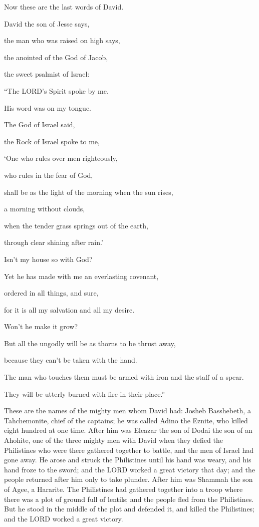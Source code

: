 \mychapter{} \myverse*{}Now these are the last words of David.

\quad\quad David the son of Jesse says,

the man who was raised on high says,

the anointed of the God of Jacob,

 the sweet psalmist of Israel:

\myverse{}“The LORD’s Spirit spoke by me.

His word was on my tongue.

\myverse{}The God of Israel said,

the Rock of Israel spoke to me,

‘One who rules over men righteously,

who rules in the fear of God,

\myverse{}shall be as the light of the morning when the sun rises,

a morning without clouds,

when the tender grass springs out of the earth,

through clear shining after rain.’


\vspace{\baselineskip} 
\myverse{}Isn’t my house so with God?

Yet he has made with me an everlasting covenant,

 ordered in all things, and sure,

for it is all my salvation and all my desire.

Won’t he make it grow?

\myverse{}But all the ungodly will be as thorns to be thrust away,

 because they can’t be taken with the hand.

\myverse{}The man who touches them must be armed with iron and the staff
of a spear.

They will be utterly burned with fire in their place.”


\myverse{}These are the names of the mighty men whom David had: Josheb Basshebeth,
a Tahchemonite, chief of the captains; he was called Adino the Eznite, who killed eight hundred at one
time.
\myverse{}After him was Eleazar the son of Dodai the son of an Ahohite, one of the three
mighty men with David when they defied the Philistines who were there gathered together to battle, and
the men of Israel had gone away.
\myverse{}He arose and struck the Philistines until his hand was weary, and his hand
froze to the sword; and the LORD worked a great victory that day; and the people returned after him only
to take plunder.
\myverse{}After him was Shammah the son of Agee, a Hararite. The Philistines had gathered
together into a troop where there was a plot of ground full of lentils; and the people fled from the Philistines.
\myverse{}But he stood in the middle of the plot and defended it, and killed the Philistines;
and the LORD worked a great victory.

